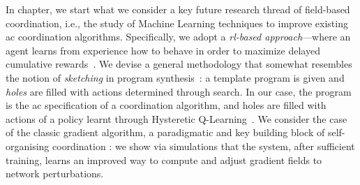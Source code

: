 In chapter, we start what we consider a key future research thread of field-based coordination, i.e.,
 the study of Machine Learning techniques 
 to improve existing \ac{ac} coordination algorithms.
%
Specifically, we adopt a \emph{\ac{rl}-based approach}---where an agent learns from experience
 how to behave in order to maximize delayed cumulative rewards~\cite{sutton2018reinforcement-learning}.
%
We devise a general methodology that somewhat resembles the notion of \emph{sketching} in program synthesis~\cite{solar2008program-synthesis-sketching}:
 a template program is given and \emph{holes} are filled with actions determined through search.
%
In our case, the program is the \ac{ac} specification of a coordination algorithm, and holes are filled with actions of a policy learnt through Hysteretic Q-Learning~\cite{DBLP:conf/iros/MatignonLF07}.
%
We consider the case of the classic gradient algorithm, a paradigmatic and key building block of self-organising coordination \cite{DBLP:journals/jlap/ViroliBDACP19,beal2013organizing-aggregate,DBLP:journals/corr/abs-2201-03473}: we show via simulations 
 that the system, after sufficient training,
 learns an improved way to compute and adjust gradient fields to network perturbations.


